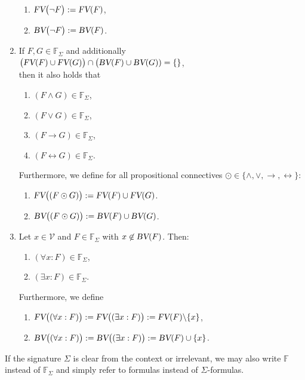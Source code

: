 \begin{Definition}
\begin{enumerate}
\begin{enumerate}
          \item $\textsl{FV}\bigl( \neg F \bigr) := \textsl{FV}(F)$,
          \item $\textsl{BV}\bigl( \neg F \bigr) := \textsl{BV}(F)$.
          \end{enumerate}
    \item If $F, G \in \mathbb{F}_\Sigma$ and additionally \\[0.2cm]
          \hspace*{1.3cm}
          $\bigl(\textsl{FV}(F) \cup \textsl{FV}(G)\bigr) \cap \bigl(\textsl{BV}(F) \cup \textsl{BV}(G)) = \{\}$,
          \\[0.2cm]
          then it also holds that
          \begin{enumerate}
          \item $(F \wedge G) \in \mathbb{F}_\Sigma$,
          \item $(F \vee G) \in \mathbb{F}_\Sigma$,
          \item $(F \rightarrow G) \in \mathbb{F}_\Sigma$,
          \item $(F \leftrightarrow G) \in \mathbb{F}_\Sigma$.
          \end{enumerate}
          Furthermore, we define for all propositional connectives $\odot \in \{ \wedge, \vee, \rightarrow, \leftrightarrow \}$:
          \begin{enumerate}
          \item $\textsl{FV}\bigl((F \odot G) \bigr) := \textsl{FV}(F) \cup \textsl{FV}(G)$.
          \item $\textsl{BV}\bigl((F \odot G) \bigr) := \textsl{BV}(F) \cup \textsl{BV}(G)$.
          \end{enumerate}
    \item Let $x \in \mathcal{V}$ and $F \in \mathbb{F}_\Sigma$ with $x \not\in \textsl{BV}(F)$. Then:
          \begin{enumerate}
          \item $(\forall x : F) \in \mathbb{F}_\Sigma$,
          \item $(\exists x : F) \in \mathbb{F}_\Sigma$.
          \end{enumerate}
          Furthermore, we define
          \begin{enumerate}
          \item $\textsl{FV}\bigl( (\forall x : F) \bigr) := \textsl{FV}\bigl( (\exists x : F) \bigr) := \textsl{FV}(F) \backslash \{x\}$,
          \item $\textsl{BV}\bigl( (\forall x : F) \bigr) := \textsl{BV}\bigl( (\exists x : F) \bigr) := \textsl{BV}(F) \cup \{x\}$.  
          \end{enumerate}
    \end{enumerate}
    If the signature $\Sigma$ is clear from the context or irrelevant, we may also write
    $\mathbb{F}$ instead of $\mathbb{F}_\Sigma$ and simply refer to formulas instead of $\Sigma$-formulas.
    \eox
\end{Definition}


